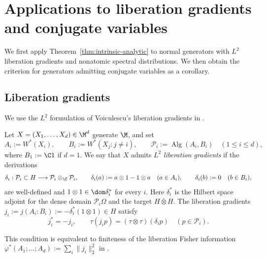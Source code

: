 \section{Applications to liberation gradients and conjugate variables}
\label{sec:conjugate-variable-criterion}

We first apply Theorem~\ref{thm:intrinsic-analytic} to normal generators with $L^2$ liberation gradients and nonatomic spectral distributions.
We then obtain the criterion for generators admitting conjugate variables as a corollary.

\subsection{Liberation gradients}\label{subsec:liberation-gradients}

We use the $L^2$ formulation of Voiculescu's liberation gradients in \cite[5.3--5.4 and Proposition~6.1]{Voi99}.
\begin{definition}\label{def:liberation-gradients}
Let $X=(X_1,\ldots,X_d)\in\M^d$ generate $\M$, and set
\[
 A_i:=W^*(X_i),\qquad B_i:=W^*(X_j:j\ne i),\qquad
 \mathcal P_i:=\operatorname{Alg}(A_i,B_i)
 \quad(1\leq i\leq d),
\]
where $B_1:=\C1$ if $d=1$.
We say that $X$ admits \emph{$L^2$ liberation gradients} if the derivations
\[
 \delta_i:\mathcal P_i\subset H\longrightarrow
          \mathcal P_i\otimes_{\C}\mathcal P_i,\qquad
 \delta_i(a):=a\otimes1-1\otimes a\quad(a\in A_i),\qquad
 \delta_i(b):=0\quad(b\in B_i),
\]
are well-defined and $1\otimes1\in\dom\delta_i^*$ for every $i$.
Here $\delta_i^*$ is the Hilbert space adjoint for the dense domain $\mathcal P_i\Omega$ and the target $H\bar\otimes H$.
The liberation gradients $j_i:=j(A_i:B_i):=-\delta_i^*(1\otimes1)\in H$ satisfy
\[
 j_i^*=-j_i,\qquad
 \tau(j_ip)=(\tau\otimes\tau)(\delta_ip)
 \quad(p\in\mathcal P_i).
\]
\end{definition}
This condition is equivalent to finiteness of the liberation Fisher information
$\varphi^*(A_1;\ldots;A_d):=\sum_i\|j_i\|_2^2$ in \cite[Definition~9.1]{Voi99}.

